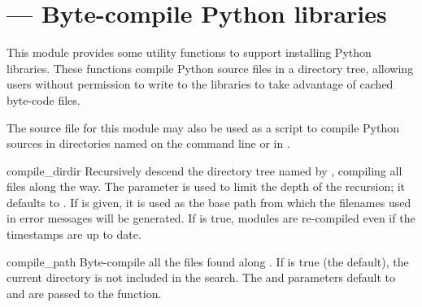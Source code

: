 \section{ ---
         Byte-compile Python libraries}



This module provides some utility functions to support installing
Python libraries.  These functions compile Python source files in a
directory tree, allowing users without permission to write to the
libraries to take advantage of cached byte-code files.

The source file for this module may also be used as a script to
compile Python sources in directories named on the command line or in
.


\begin{funcdesc}{compile_dir}{dir}
  Recursively descend the directory tree named by , compiling
  all  files along the way.  The  parameter
  is used to limit the depth of the recursion; it defaults to
  .  If  is given, it is used as the base path from 
  which the filenames used in error messages will be generated.  If
   is true, modules are re-compiled even if the timestamps
  are up to date.
\end{funcdesc}

\begin{funcdesc}{compile_path}{}
  Byte-compile all the  files found along .
  If  is true (the default), the current directory is
  not included in the search.  The  and
   parameters default to  and are passed to the
   function.
\end{funcdesc}


\begin{seealso}
\end{seealso}
